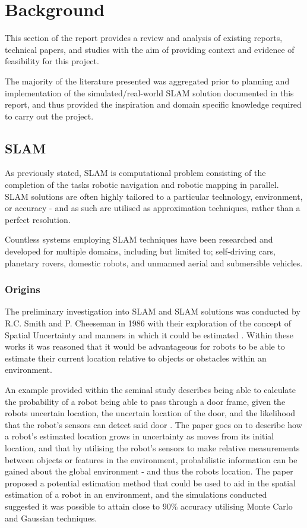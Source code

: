 \section{Background} \label{sec_background}
This section of the report provides a review and analysis of existing reports,
technical papers, and studies with the aim of providing context and evidence
of feasibility for this project.

The majority of the literature presented was aggregated prior to planning and
implementation of the simulated/real-world SLAM solution documented in this report,
and thus provided the inspiration and domain specific knowledge required to
carry out the project.


\subsection{SLAM}
As previously stated, SLAM is computational problem consisting of the
completion of the tasks robotic navigation and robotic mapping in parallel.
SLAM solutions are often highly tailored to a particular technology,
environment, or accuracy - and as such are utilised as approximation
techniques, rather than a perfect resolution.

Countless systems employing SLAM techniques have been researched and developed
for multiple domains, including but limited to; self-driving cars, planetary
rovers, domestic robots, and unmanned aerial and submersible vehicles.

\subsubsection{Origins}
The preliminary investigation into SLAM and SLAM solutions was conducted by
R.C. Smith and P. Cheeseman in 1986 with their exploration of the concept of
Spatial Uncertainty and manners in which it could be estimated
\cite{Smith1986,Smith1988}.
Within these works it was reasoned that it would be advantageous for robots to
be able to estimate their current location relative to objects or obstacles
within an environment.

An example provided within the seminal study describes being
able to calculate the probability of a robot being able to pass through a
door frame, given the robots uncertain location, the uncertain location of the
door, and the likelihood that the robot's sensors can detect said door
\cite{Smith1986}. 
The paper goes on to describe how a robot's estimated location grows in
uncertainty as moves from its initial location, and that by utilising the
robot's sensors to make relative measurements between objects or features in the
environment, probabilistic information can be gained about the global
environment - and thus the robots location.
The paper proposed a potential estimation method that could be used to aid
in the spatial estimation of a robot in an environment, and the simulations
conducted suggested it was possible to attain close to 90\% accuracy utilising
Monte Carlo and Gaussian techniques.

